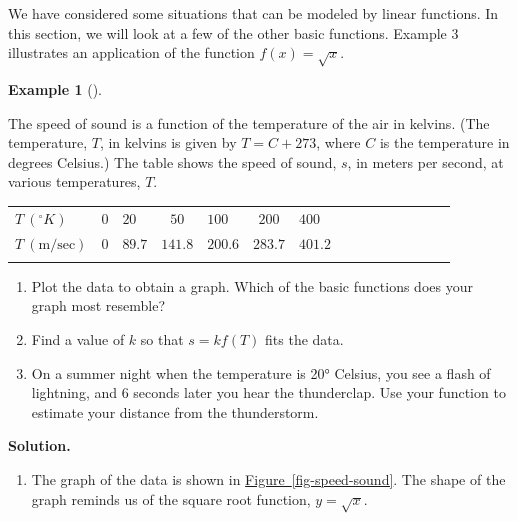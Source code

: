 \documentclass[10pt,]{book}
\theoremstyle{plain}
\theoremstyle{definition}
\theoremstyle{definition}
\theoremstyle{definition}
\newtheorem{example}[theorem]{Example}
\theoremstyle{definition}
\theoremstyle{definition}
\numberwithin{equation}{section}
\newcommand{\hrulethin}  {\noalign{\hrule height 0.04em}}
\newcommand{\hrulethick} {\noalign{\hrule height 0.11em}}
\newcommand\degree[0]{^{\circ}}
\begin{document}
        We have considered some situations that can be modeled by linear functions. In this section, we will look at a few of the other basic functions. Example 3 illustrates an application of the function \(f (x) =\sqrt{x}\).
\begin{example}[]\label{example-sound}

    The speed of sound is a function of the temperature of the air in kelvins. (The temperature, \(T\), in kelvins is given by \(T = C + 273\), where \(C\) is the temperature in degrees Celsius.) The table shows the speed of sound, \(s\), in meters per second, at various temperatures, \(T\).
%
\leavevmode%
\begin{table}
\centering
\begin{tabular}{AcAcAcAcAcAcAcA}\hrulethick
\(T ~ (\degree K)\)&\(0\)&\(20\)&\(50\)&\(100\)&\(200\)&\(400\)\tabularnewline\hrulethin
\(T ~ (\text{m/sec})\)&\(0\)&\(89.7\)&\(141.8\)&\(200.6\)&\(283.7\)&\(401.2\)\tabularnewline\hrulethin
\end{tabular}
\end{table}
\leavevmode%
\begin{enumerate}[label=*\alph**]
\item\hypertarget{li-327}{}
            Plot the data to obtain a graph. Which of the basic functions does your graph most resemble?\item\hypertarget{li-328}{}
            Find a value of \(k\) so that \(s = k f (T )\) fits the data.\item\hypertarget{li-329}{}
            On a summer night when the temperature is 20° Celsius, you see a flash of lightning, and \(6\) seconds later you hear the thunderclap. Use your function to estimate your distance from the thunderstorm.\end{enumerate}
\par\medskip\noindent%
\textbf{Solution.}\quad \leavevmode%
\begin{enumerate}[label=*\alph**]
\item\hypertarget{li-330}{}
            The graph of the data is shown in \hyperref[fig-speed-sound]{Figure~\ref{fig-speed-sound}}. The shape of the graph reminds us of the square root function, \(y = \sqrt{x}\).
            \leavevmode%
\begin{figure}
\centering

\end{figure}
\end{enumerate}
\end{example}
\end{document}
